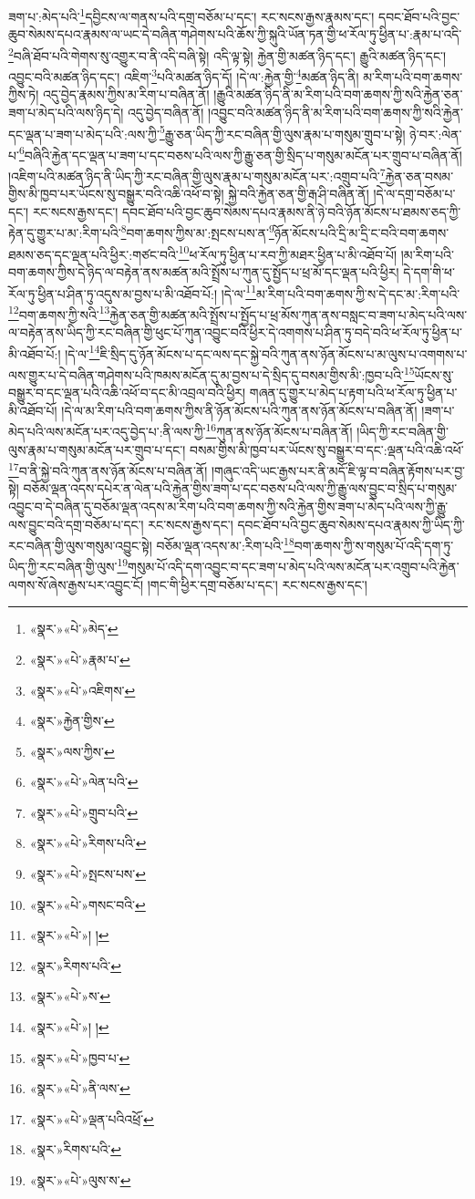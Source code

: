 ཟག་པ་:མེད་པའི་\footnote{«སྣར་»«པེ་»མེད་}དབྱིངས་ལ་གནས་པའི་དགྲ་བཅོམ་པ་དང་། རང་སངས་རྒྱས་རྣམས་དང་། དབང་ཐོབ་པའི་བྱང་ཆུབ་སེམས་དཔའ་རྣམས་ལ་ཡང་དེ་བཞིན་གཤེགས་པའི་ཆོས་ཀྱི་སྐུའི་ཡོན་ཏན་གྱི་ཕ་རོལ་ཏུ་ཕྱིན་པ་:རྣམ་པ་འདི་\footnote{«སྣར་»«པེ་»རྣམ་པ་}བཞི་ཐོབ་པའི་གེགས་སུ་འགྱུར་བ་ནི་འདི་བཞི་སྟེ། འདི་ལྟ་སྟེ། རྐྱེན་གྱི་མཚན་ཉིད་དང་། རྒྱུའི་མཚན་ཉིད་དང་། འབྱུང་བའི་མཚན་ཉིད་དང་། འཇིག་\footnote{«སྣར་»«པེ་»འཇིགས་}པའི་མཚན་ཉིད་དོ། །དེ་ལ་:རྐྱེན་གྱི་\footnote{«སྣར་»རྐྱེན་གྱིས་}མཚན་ཉིད་ནི། མ་རིག་པའི་བག་ཆགས་ཀྱིས་ཏེ། འདུ་བྱེད་རྣམས་ཀྱིས་མ་རིག་པ་བཞིན་ནོ། །རྒྱུའི་མཚན་ཉིད་ནི་མ་རིག་པའི་བག་ཆགས་ཀྱི་སའི་རྐྱེན་ཅན་ཟག་པ་མེད་པའི་ལས་ཉིད་དེ། འདུ་བྱེད་བཞིན་ནོ། །འབྱུང་བའི་མཚན་ཉིད་ནི་མ་རིག་པའི་བག་ཆགས་ཀྱི་སའི་རྐྱེན་དང་ལྡན་པ་ཟག་པ་མེད་པའི་:ལས་ཀྱི་\footnote{«སྣར་»ལས་ཀྱིས་}རྒྱུ་ཅན་ཡིད་ཀྱི་རང་བཞིན་གྱི་ལུས་རྣམ་པ་གསུམ་གྲུབ་པ་སྟེ། ཉེ་བར་:ལེན་པ་\footnote{«སྣར་»«པེ་»ལེན་པའི་}བཞིའི་རྐྱེན་དང་ལྡན་པ་ཟག་པ་དང་བཅས་པའི་ལས་ཀྱི་རྒྱུ་ཅན་གྱི་སྲིད་པ་གསུམ་མངོན་པར་གྲུབ་པ་བཞིན་ནོ། །འཇིག་པའི་མཚན་ཉིད་ནི་ཡིད་ཀྱི་རང་བཞིན་གྱི་ལུས་རྣམ་པ་གསུམ་མངོན་པར་:འགྲུབ་པའི་\footnote{«སྣར་»«པེ་»གྲུབ་པའི་}རྐྱེན་ཅན་བསམ་གྱིས་མི་ཁྱབ་པར་ཡོངས་སུ་བསྒྱུར་བའི་འཆི་འཕོ་བ་སྟེ། སྐྱེ་བའི་རྐྱེན་ཅན་གྱི་རྒ་ཤི་བཞིན་ནོ། །དེ་ལ་དགྲ་བཅོམ་པ་དང་། རང་སངས་རྒྱས་དང་། དབང་ཐོབ་པའི་བྱང་ཆུབ་སེམས་དཔའ་རྣམས་ནི་ཉེ་བའི་ཉོན་མོངས་པ་ཐམས་ཅད་ཀྱི་རྟེན་དུ་གྱུར་པ་མ་:རིག་པའི་\footnote{«སྣར་»«པེ་»རིགས་པའི་}བག་ཆགས་ཀྱིས་མ་:སྤངས་པས་ན་\footnote{«སྣར་»«པེ་»སྤངས་པས་}ཉོན་མོངས་པའི་དྲི་མ་དྲི་ང་བའི་བག་ཆགས་ཐམས་ཅད་དང་ལྡན་པའི་ཕྱིར་:གཙང་བའི་\footnote{«སྣར་»«པེ་»གསང་བའི་}ཕ་རོལ་ཏུ་ཕྱིན་པ་རབ་ཀྱི་མཐར་ཕྱིན་པ་མི་འཐོབ་པོ། །མ་རིག་པའི་བག་ཆགས་ཀྱིས་དེ་ཉིད་ལ་བརྟེན་ནས་མཚན་མའི་སྤྲོས་པ་ཀུན་དུ་སྤྱོད་པ་ཕྲ་མོ་དང་ལྡན་པའི་ཕྱིར། དེ་དག་གི་ཕ་རོལ་ཏུ་ཕྱིན་པ་ཤིན་ཏུ་འདུས་མ་བྱས་པ་མི་འཐོབ་པོ:། །དེ་ལ་\footnote{«སྣར་»«པེ་»། །}མ་རིག་པའི་བག་ཆགས་ཀྱི་ས་དེ་དང་མ་:རིག་པའི་\footnote{«སྣར་»རིགས་པའི་}བག་ཆགས་ཀྱི་སའི་\footnote{«སྣར་»«པེ་»ས་}རྐྱེན་ཅན་གྱི་མཚན་མའི་སྤྲོས་པ་སྤྱོད་པ་ཕྲ་མོས་ཀུན་ནས་བསླང་བ་ཟག་པ་མེད་པའི་ལས་ལ་བརྟེན་ནས་ཡིད་ཀྱི་རང་བཞིན་གྱི་ཕུང་པོ་ཀུན་འབྱུང་བའི་ཕྱིར་དེ་འགགས་པ་ཤིན་ཏུ་བདེ་བའི་ཕ་རོལ་ཏུ་ཕྱིན་པ་མི་འཐོབ་པོ:། །དེ་ལ་\footnote{«སྣར་»«པེ་»། །}ཇི་སྲིད་དུ་ཉོན་མོངས་པ་དང་ལས་དང་སྐྱེ་བའི་ཀུན་ནས་ཉོན་མོངས་པ་མ་ལུས་པ་འགགས་པ་ལས་གྱུར་པ་དེ་བཞིན་གཤེགས་པའི་ཁམས་མངོན་དུ་མ་བྱས་པ་དེ་སྲིད་དུ་བསམ་གྱིས་མི་:ཁྱབ་པའི་\footnote{«སྣར་»«པེ་»ཁྱབ་པ་}ཡོངས་སུ་བསྒྱུར་བ་དང་ལྡན་པའི་འཆི་འཕོ་བ་དང་མི་འབྲལ་བའི་ཕྱིར། གཞན་དུ་གྱུར་པ་མེད་པ་རྟག་པའི་ཕ་རོལ་ཏུ་ཕྱིན་པ་མི་འཐོབ་པོ། །དེ་ལ་མ་རིག་པའི་བག་ཆགས་ཀྱིས་ནི་ཉོན་མོངས་པའི་ཀུན་ནས་ཉོན་མོངས་པ་བཞིན་ནོ། །ཟག་པ་མེད་པའི་ལས་མངོན་པར་འདུ་བྱེད་པ་:ནི་ལས་ཀྱི་\footnote{«སྣར་»«པེ་»ནི་ལས་}ཀུན་ནས་ཉོན་མོངས་པ་བཞིན་ནོ། །ཡིད་ཀྱི་རང་བཞིན་གྱི་ལུས་རྣམ་པ་གསུམ་མངོན་པར་གྲུབ་པ་དང་། བསམ་གྱིས་མི་ཁྱབ་པར་ཡོངས་སུ་བསྒྱུར་བ་དང་:ལྡན་པའི་འཆི་འཕོ་\footnote{«སྣར་»«པེ་»ལྡན་པའིའཕྲོ་}བ་ནི་སྐྱེ་བའི་ཀུན་ནས་ཉོན་མོངས་པ་བཞིན་ནོ། །གཞུང་འདི་ཡང་རྒྱས་པར་ནི་མདོ་ཇི་ལྟ་བ་བཞིན་རྟོགས་པར་བྱ་སྟེ། བཅོམ་ལྡན་འདས་དཔེར་ན་ལེན་པའི་རྐྱེན་གྱིས་ཟག་པ་དང་བཅས་པའི་ལས་ཀྱི་རྒྱུ་ལས་བྱུང་བ་སྲིད་པ་གསུམ་འབྱུང་བ་དེ་བཞིན་དུ་བཅོམ་ལྡན་འདས་མ་རིག་པའི་བག་ཆགས་ཀྱི་སའི་རྐྱེན་གྱིས་ཟག་པ་མེད་པའི་ལས་ཀྱི་རྒྱུ་ལས་བྱུང་བའི་དགྲ་བཅོམ་པ་དང་། རང་སངས་རྒྱས་དང་། དབང་ཐོབ་པའི་བྱང་ཆུབ་སེམས་དཔའ་རྣམས་ཀྱི་ཡིད་ཀྱི་རང་བཞིན་གྱི་ལུས་གསུམ་འབྱུང་སྟེ། བཅོམ་ལྡན་འདས་མ་:རིག་པའི་\footnote{«སྣར་»རིགས་པའི་}བག་ཆགས་ཀྱི་ས་གསུམ་པོ་འདི་དག་ཏུ་ཡིད་ཀྱི་རང་བཞིན་གྱི་ལུས་\footnote{«སྣར་»«པེ་»ལུས་ས་}གསུམ་པོ་འདི་དག་འབྱུང་བ་དང་ཟག་པ་མེད་པའི་ལས་མངོན་པར་འགྲུབ་པའི་རྐྱེན་ལགས་སོ་ཞེས་རྒྱས་པར་འབྱུང་ངོ། །གང་གི་ཕྱིར་དགྲ་བཅོམ་པ་དང་། རང་སངས་རྒྱས་དང་། 